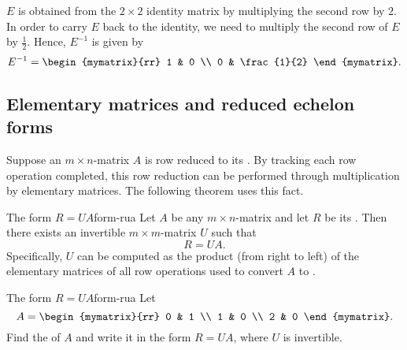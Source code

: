 \begin{solution}
  $E$ is obtained from the $2\times 2$ identity matrix by multiplying
  the second row by $2$. In order to carry $E$ back to the identity,
  we need to multiply the second row of $E$ by $\frac{1}{2}$.  Hence,
  $E^{-1}$ is given by
  \begin{equation*}
    E^{-1}
    =
    \begin{mymatrix}{rr}
      1 & 0 \\
      0 & \frac{1}{2}
    \end{mymatrix}.
  \end{equation*}
\end{solution}

\subsection{Elementary matrices and reduced echelon forms}

Suppose an $m\times n$-matrix $A$ is row reduced to its {\rref}. By
tracking each row operation completed, this row reduction can be
performed through multiplication by elementary matrices. The following
theorem uses this fact.

\begin{theorem}{The form $R=UA$}{form-rua}
  Let $A$ be any $m\times n$-matrix and let $R$ be its {\rref}. Then
  there exists an invertible $m\times m$-matrix $U$ such that
  \begin{equation*}
    R=UA.
  \end{equation*}
  Specifically, $U$ can be computed as the product (from right to
  left) of the elementary matrices of all row operations used to
  convert $A$ to {\rref}.
\end{theorem}

\begin{example}{The form $R=UA$}{form-rua}
  Let
  \begin{equation*}
    A = \begin{mymatrix}{rr}
      0 & 1 \\
      1 & 0 \\
      2 & 0
    \end{mymatrix}.
  \end{equation*}
  Find the {\rref} of $A$ and write it in the form $R=UA$, where $U$
  is invertible.
\end{example}

